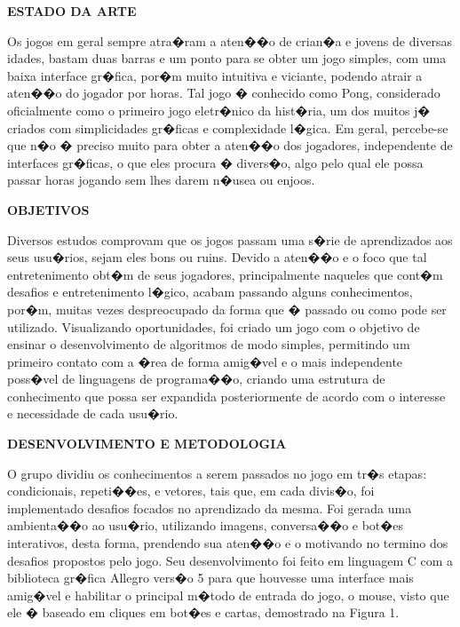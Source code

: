 \documentclass[a4paper]{article}
\begin{document}
\break

\begin{flushleft}
\textbf{\large ESTADO DA ARTE\\}
\end{flushleft}

Os jogos em geral sempre atra�ram a aten��o de crian�a e jovens de diversas idades,
bastam duas barras e um ponto para se obter um jogo simples, com uma baixa
interface gr�fica, por�m muito intuitiva e viciante, podendo atrair a aten��o do jogador
por horas. Tal jogo � conhecido como Pong, considerado oficialmente como o primeiro
jogo eletr�nico da hist�ria, um dos muitos j� criados com simplicidades gr�ficas e
complexidade l�gica.
Em geral, percebe-se que n�o � preciso muito para obter a aten��o dos
jogadores, independente de interfaces gr�ficas, o que eles procura � divers�o, algo pelo
qual ele possa passar horas jogando sem lhes darem n�usea ou enjoos.\\

\break


\begin{flushleft}
\textbf{\large OBJETIVOS}
\end{flushleft}
Diversos estudos comprovam que os jogos passam uma s�rie de aprendizados aos seus
usu�rios, sejam eles bons ou ruins. Devido a aten��o e o foco que tal entretenimento
obt�m de seus jogadores, principalmente naqueles que cont�m desafios e entretenimento
l�gico, acabam passando alguns conhecimentos, por�m, muitas vezes despreocupado da
forma que � passado ou como pode ser utilizado.
Visualizando oportunidades, foi criado um jogo com o objetivo de ensinar o
desenvolvimento de algoritmos de modo simples, permitindo um primeiro contato com
a �rea de forma amig�vel e o mais independente poss�vel de linguagens de programa��o,
criando uma estrutura de conhecimento que possa ser expandida posteriormente de
acordo com o interesse e necessidade de cada usu�rio.
\break

\begin{flushleft}
\textbf{\large DESENVOLVIMENTO E METODOLOGIA}
\end{flushleft}
O grupo dividiu os conhecimentos a serem passados no jogo em tr�s etapas:
condicionais, repeti��es, e vetores, tais que, em cada divis�o, foi implementado desafios
focados no aprendizado da mesma. Foi gerada uma ambienta��o ao usu�rio, utilizando
imagens, conversa��o e bot�es interativos, desta forma, prendendo sua aten��o e o
motivando no termino dos desafios propostos pelo jogo.
Seu desenvolvimento foi feito em linguagem C com a biblioteca gr�fica Allegro
vers�o 5 para que houvesse uma interface mais amig�vel e habilitar o principal m�todo
de entrada do jogo, o mouse, visto que ele � baseado em cliques em bot�es e cartas,
demostrado na Figura 1.
\end{document}
